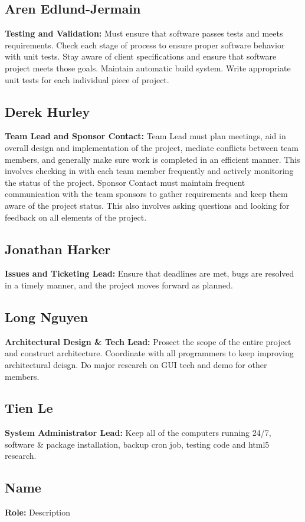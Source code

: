 \documentclass[12pt, letterpaper]{article}
\begin{document}
  \subsection{Aren Edlund-Jermain}
  {\bf Testing and Validation:} Must ensure that software passes tests and meets requirements. Check each stage of process to ensure proper software behavior with unit tests. Stay aware of client specifications and ensure that software project meets those goals. Maintain automatic build system. Write appropriate unit tests for each individual piece of project.
  \subsection{Derek Hurley}
  {\bf Team Lead and Sponsor Contact:} Team Lead must plan meetings, aid in overall design and implementation of the project, mediate conflicts between team members, and generally make sure work is completed in an efficient manner. This involves checking in with each team member frequently and actively monitoring the status of the project. Sponsor Contact must maintain frequent communication with the team sponsors to gather requirements and keep them aware of the project status. This also involves asking questions and looking for feedback on all elements of the project.
  \subsection{Jonathan Harker}
  {\bf Issues and Ticketing Lead:} Ensure that deadlines are met, bugs are resolved in a timely manner, and the project moves forward as planned.
  \subsection{Long Nguyen}
  {\bf Architectural Design & Tech Lead:} Prosect the scope of the entire project and construct architecture. Coordinate with all programmers to keep improving architectural deisgn. Do major research on GUI tech and demo for other members.
  \subsection{Tien Le}
  {\bf System Administrator Lead:} Keep all of the computers running 24/7, software & package installation, backup cron job, testing code and html5 research. 
  \subsection{Name}
  {\bf Role:} Description
\end{document}
